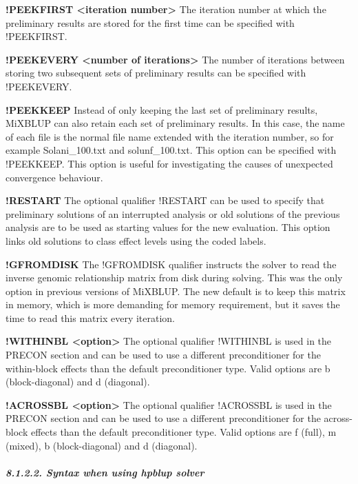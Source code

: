 \textbf{!PEEKFIRST \textless iteration number\textgreater{}} The
iteration number at which the preliminary results are stored for the
first time can be specified with !PEEKFIRST.

\textbf{!PEEKEVERY \textless number of iterations\textgreater{}} The
number of iterations between storing two subsequent sets of preliminary
results can be specified with !PEEKEVERY.

\textbf{!PEEKKEEP} Instead of only keeping the last set of preliminary
results, MiXBLUP can also retain each set of preliminary results. In
this case, the name of each file is the normal file name extended with
the iteration number, so for example Solani\_100.txt and
solunf\_100.txt. This option can be specified with !PEEKKEEP. This
option is useful for investigating the causes of unexpected convergence
behaviour.

\textbf{!RESTART} The optional qualifier !RESTART can be used to specify
that preliminary solutions of an interrupted analysis or old solutions
of the previous analysis are to be used as starting values for the new
evaluation. This option links old solutions to class effect levels using
the coded labels.

\textbf{!GFROMDISK} The !GFROMDISK qualifier instructs the solver to
read the inverse genomic relationship matrix from disk during solving.
This was the only option in previous versions of MiXBLUP. The new
default is to keep this matrix in memory, which is more demanding for
memory requirement, but it saves the time to read this matrix every
iteration.

\textbf{!WITHINBL \textless option\textgreater{}} The optional qualifier
!WITHINBL is used in the PRECON section and can be used to use a
different preconditioner for the within-block effects than the default
preconditioner type. Valid options are b (block-diagonal) and d
(diagonal).

\textbf{!ACROSSBL \textless option\textgreater{}} The optional qualifier
!ACROSSBL is used in the PRECON section and can be used to use a
different preconditioner for the across-block effects than the default
preconditioner type. Valid options are f (full), m (mixed), b
(block-diagonal) and d (diagonal).

\subparagraph{8.1.2.2. Syntax when using hpblup solver}\label{Cont06}

